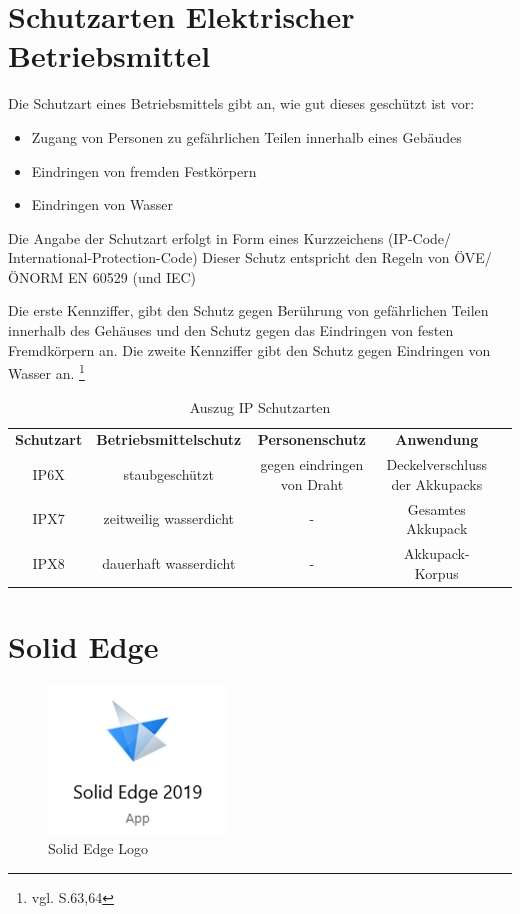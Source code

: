 \section{Schutzarten Elektrischer Betriebsmittel} 

Die Schutzart eines Betriebsmittels gibt an, wie gut dieses geschützt ist vor:
\begin{itemize}
	\item Zugang von Personen zu gefährlichen Teilen innerhalb eines Gebäudes
	\item Eindringen von fremden Festkörpern
	\item Eindringen von Wasser
\end{itemize}
 
Die Angabe der Schutzart erfolgt in Form eines Kurzzeichens (IP-Code/ International-Protection-Code)
Dieser Schutz entspricht den Regeln von ÖVE/ÖNORM EN 60529 (und IEC)

Die erste Kennziffer, gibt den Schutz gegen Berührung von gefährlichen Teilen innerhalb des Gehäuses und den Schutz gegen das Eindringen von festen Fremdkörpern an.
Die zweite Kennziffer gibt den Schutz gegen Eindringen von Wasser an. \footnote{vgl. \cite{IPSchutzarten} S.63,64}

\begin{table}[H]
	\begin{tabular}{|c|c|c|c|l}
\cline{1-4}
		\textbf{Schutzart} & \textbf{Betriebsmittelschutz} & \textbf{Personenschutz}    & \textbf{Anwendung}             &  \\ \cline{1-4}
		IP6X               & staubgeschützt                & gegen eindringen von Draht & Deckelverschluss der Akkupacks &  \\ \cline{1-4}
		IPX7               & zeitweilig wasserdicht        & -                          & Gesamtes Akkupack              &  \\ \cline{1-4}
		IPX8               & dauerhaft wasserdicht         & -                          & Akkupack-Korpus                &  \\ \cline{1-4}
	\end{tabular}
	\caption{Auszug IP Schutzarten}
\end{table}


\newpage

\section{Solid Edge}


\begin{figure} [H]
	\begin{center}
		\includegraphics[scale=0.5]{figures/mechanik/Untitled.jpg}
			\caption{Solid Edge Logo}
			\label{fig:Solid Edge Logo}
	\end{center}
\end{figure}


